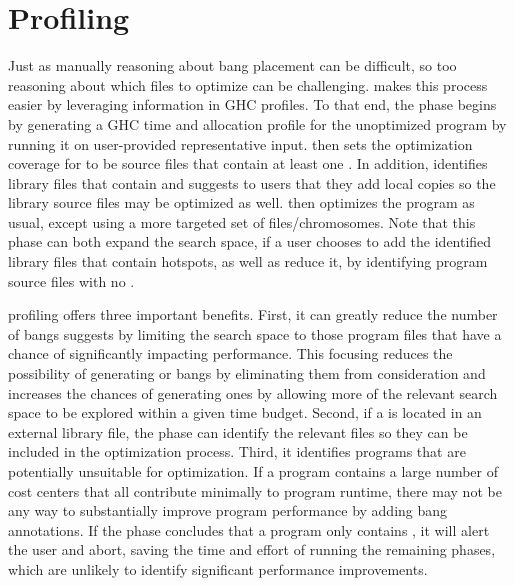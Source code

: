 
\section{\Preopt{} Profiling}

Just as manually reasoning about bang placement can be difficult,
so too reasoning about which files to optimize can be challenging.
\At{} makes this process easier by leveraging information
in GHC profiles.
To that end, the \preopt{} phase begins by generating a GHC time
and allocation profile for the unoptimized program by running it on
user-provided representative input.
\At{} then sets the optimization coverage
for \Ao{} to be source files that contain at least one \hotspot{}.
In addition,
\At{} identifies library files that contain \hotspots{} and
suggests to users that they add local copies so the library source
files may be optimized as well.
\Ao{} then optimizes the program as usual, except using a more
targeted set of files/chromosomes.
Note that this phase can both expand the search space, if a user
chooses to add the identified
library files that contain hotspots, as well as reduce it, by
identifying program source files with no \hotspots{}.

\Preopt{} profiling offers three important benefits.
First, it can greatly reduce the number of bangs \Ao{} suggests by
limiting the search space to those program files that have a chance of
significantly impacting performance. This focusing reduces the
possibility of generating \useless{} or \dangerous{} bangs by
eliminating them from consideration and
increases the chances of generating \useful{} ones by allowing more of
the relevant search space to be explored within a given time budget.
Second, if a \hotspot{} is located in an external library file,
the \preopt{} phase can identify the relevant files so they can be
included in the optimization process.
Third, it identifies programs that are potentially unsuitable for
\Ao{} optimization. If a program contains a large number of cost
centers that all contribute minimally to program runtime, there may
not be any way to substantially improve program performance by adding
bang annotations. If the \preopt{} phase concludes that
a program only contains \coldspots{}, it will alert the user and
abort, saving the time and effort of running the remaining phases,
which are unlikely to identify significant performance improvements.

